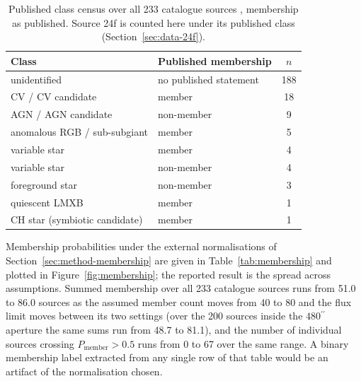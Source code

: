 \documentclass[11pt]{article}
\newcommand{\as}{\ensuremath{^{\prime\prime}}}
\begin{document}
\begin{table}[tbp]
\centering
\small
\caption{Published class census over all 233 catalogue sources \citep{Henleywillis2018}, membership as published. Source 24f is counted here under its published class (Section~\ref{sec:data-24f}).}
\label{tab:classes}
\begin{tabular}{llc}
\toprule
Class & Published membership & $n$ \\
\midrule
unidentified & no published statement & 188 \\
CV / CV candidate & member & 18 \\
AGN / AGN candidate & non-member & 9 \\
anomalous RGB / sub-subgiant & member & 5 \\
variable star & member & 4 \\
variable star & non-member & 4 \\
foreground star & non-member & 3 \\
quiescent LMXB & member & 1 \\
CH star (symbiotic candidate) & member & 1 \\
\bottomrule
\end{tabular}
\end{table}

Membership probabilities under the external normalisations of Section~\ref{sec:method-membership} are given in Table~\ref{tab:membership} and plotted in Figure~\ref{fig:membership}; the reported result is the spread across assumptions. Summed membership over all 233 catalogue sources runs from 51.0 to 86.0 sources as the assumed member count moves from 40 to 80 and the flux limit moves between its two settings (over the 200 sources inside the $480\as$ aperture the same sums run from 48.7 to 81.1), and the number of individual sources crossing $P_{\mathrm{member}} > 0.5$ runs from 0 to 67 over the same range. A binary membership label extracted from any single row of that table would be an artifact of the normalisation chosen.
\end{document}
